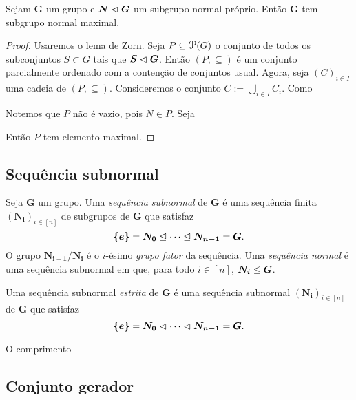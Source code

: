 \begin{conj}
Sejam $\bm G$ um grupo e $\bm N \mathrel{\lhd} \bm G$ um subgrupo normal próprio. Então $\bm G$ tem subgrupo normal maximal.
\end{conj}
\begin{proof}
Usaremos o lema de Zorn. Seja $P \subseteq \p(G)$ o conjunto de todos os subconjuntos $S \subset G$ tais que $\bm S \mathrel{\lhd} \bm G$. Então $(P,\subseteq)$ é um conjunto parcialmente ordenado com a contenção de conjuntos usual. Agora, seja $(C)_{i \in I}$ uma cadeia de $(P,\subseteq)$. Consideremos o conjunto $C := \bigcup_{i \in I} C_i$. Como 

Notemos que $P$ não é vazio, pois $N \in P$. Seja 



Então $P$ tem elemento maximal.
\end{proof}






\subsection{Sequência subnormal}

\begin{defi}
Seja $\bm G$ um grupo. Uma \emph{sequência subnormal} de $\bm G$ é uma sequência finita $(\bm{N_i})_{i \in [n]}$ de subgrupos de $\bm G$ que satisfaz
	\begin{equation*}
	\bm{\{e\}} = \bm{N_0} \mathrel{\unlhd} \cdots \mathrel{\unlhd} \bm{N_{n-1}} = \bm G.
	\end{equation*}
O grupo $\bm{N_{i+1}/N_i}$ é o $i$-ésimo \emph{grupo fator} da sequência.
Uma \emph{sequência normal} é uma sequência subnormal em que, para todo $i \in [n]$, $\bm{N_i} \mathrel{\unlhd} \bm G$.

Uma sequência subnormal \emph{estrita} de $\bm G$ é uma sequência subnormal $(\bm{N_i})_{i \in [n]}$ de $\bm G$ que satisfaz
	\begin{equation*}
	\bm{\{e\}} = \bm{N_0} \mathrel{\lhd} \cdots \mathrel{\lhd} \bm{N_{n-1}} = \bm G.
	\end{equation*}
	
O comprimento
\end{defi}



\subsection{Conjunto gerador}

